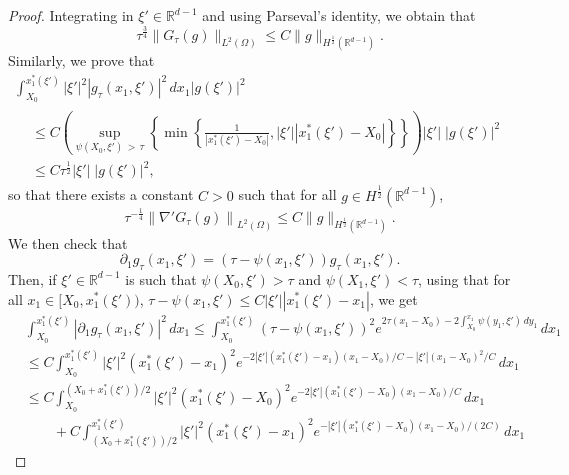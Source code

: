 \documentclass[10pt]{amsart}
\theoremstyle{definition}\newtheorem{defi}[theo]{Definition}\newtheorem{rema}[theo]{Remark}\newtheorem{exam}[theo]{Example}\newtheorem{exem}[theo]{Example}\newtheorem{nota}[theo]{Notation}
\newcommand*\R{\mathbb{R}}
\renewcommand{\leq}{\leqslant}
\begin{document}
\begin{proof}
Integrating in $\xi' \in \R^{d-1}$ and using Parseval's identity, we obtain that
\begin{equation*}
\tau^{\frac{3}{4}} \| G_{\tau} (g) \|_{L^2(\Omega)}
\leq C \| g \|_{H^{\frac{1}{2}}\left(\R^{d-1}\right)}.
\end{equation*}
Similarly, we prove that
\begin{multline*}
\int_{X_0}^{x_1^*(\xi')} \left|\xi'\right|^2 \left|g_\tau(x_1, \xi')\right|^2 \, dx_1 \left|g(\xi')\right|^2
\\
\begin{aligned}
&\leq  C 
\left( \sup_{\psi(X_0, \xi')\, >\,\tau}
\left\{
\min\left\{\frac{1}{\left|x_1^*(\xi')
-  X_0\right|}, |\xi'| \left|x_1^*(\xi')- X_0\right| \right\}
\right\} \!\right) \left|\xi'\right|\; |g(\xi')|^2\\
&\leq   C \tau^{\frac{1}{2}} \left|\xi'\right|\; \left|g(\xi')\right|^2,
\end{aligned}
\end{multline*}
so that there exists a constant $C>0$ such that for all $g \in H^{\frac{1}{2}}(\R^{d-1})$,
\begin{equation*}
\tau^{-\frac{1}{4}} \left\|\nabla' G_{\tau} (g) \right\|_{L^2(\Omega)}
\leq C \| g \|_{H^{\frac{1}{2}}\left(\R^{d-1}\right)}.
\end{equation*}
We then check that
\[
\partial_1 g_\tau(x_1, \xi') = \left(\tau - \psi(x_1, \xi')\right) g_{\tau}\left(x_1, \xi'\right).
\]
Then, if $\xi' \in \R^{d-1}$ is such that $\psi(X_0, \xi') > \tau$ and $\psi(X_1, \xi') < \tau$, using that for all $x_1 \in [X_0, x_1^*(\xi'))$, $\tau - \psi(x_1, \xi') \leq C |\xi'| |x_1^*(\xi') - x_1|$, we get
\begin{align*}
& \int_{X_0}^{x_1^*(\xi')} \left|\partial_1 g_\tau(x_1, \xi')\right|^2 \, dx_1
\leq
\int_{X_0}^{x_1^*(\xi')} \left(\tau - \psi(x_1, \xi')\right)^2 e^{2 \tau (x_1 -X_0) - 2 \int_{X_0}^{x_1} \psi(y_1, \xi') \, dy_1 } \, dx_1
\\
& \leq C \int_{X_0}^{x_1^*(\xi')} \left|\xi'\right|^2 \left(x_1^*(\xi') - x_1\right)^2 e^{- 2 \left|\xi'\right| \left(x_1^*(\xi') - x_1\right) (x_1 -X_0)/C - |\xi'| (x_1- X_0)^2/C} \, dx_1
\\
& \leq C \int_{X_0}^{\left(X_0+x_1^*(\xi')\right)/2} |\xi'|^2 \left(x_1^*(\xi') - X_0\right)^2 e^{- 2 |\xi'|\left(x_1^*(\xi') - X_0\right) (x_1 -X_0)/C} \, dx_1
\\
& \qquad + C \int_{\left(X_0+x_1^*(\xi')\right)/2}^{x_1^*(\xi')} |\xi'|^2 \left(x_1^*(\xi') - x_1\right)^2 e^{- |\xi'| \left(x_1^*(\xi') - X_0\right) (x_1- X_0)/(2C)} \, dx_1

\end{align*}
\end{proof}
\end{document}
